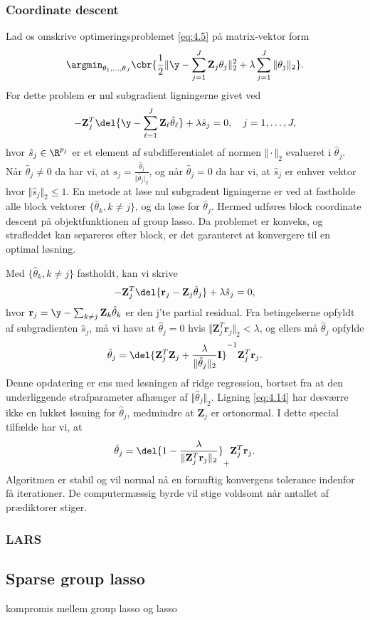 \subsubsection{Coordinate descent}
Lad os omskrive optimeringsproblemet \eqref{eq:4.5} på matrix-vektor form
\begin{align*}
\argmin_{\theta_1, \ldots, \theta_J} \cbr{\frac{1}{2} \Vert \y - \sum_{j=1}^J \mathbf{Z}_{j} \theta_j \Vert_2^2 + \lambda \sum_{j=1}^J \Vert \theta_j \Vert_2}.
\end{align*}
For dette problem er nul subgradient ligningerne givet ved
\begin{align*}
- \mathbf{Z}_{j}^T \del{\y - \sum_{\ell=1}^J \mathbf{Z}_\ell \hat{\theta}_\ell} + \lambda \hat{s}_j = 0, \quad j=1,\ldots, J,
\end{align*} 
hvor $\hat{s}_j \in \R^{p_j}$ er et element af subdifferentialet af normen $\Vert \cdot \Vert_2$ evalueret i $\hat{\theta}_j$.
Når $\hat{\theta}_j \neq 0$ da har vi, at $\hat{s}_j = \frac{\hat{\theta}_j}{\Vert \hat{\theta}_j \vert_2}$, og når $\hat{\theta}_j=0$ da har vi, at $\hat{s}_j$ er enhver vektor hvor $\Vert \hat{s}_j \Vert_2 \leq 1$.
En metode at løse nul subgradent ligningerne er ved at fastholde alle block vektorer $\{\hat{\theta}_k, k \neq j\}$, og da løse for $\hat{\theta}_j$.
Hermed udføres block coordinate descent på objektfunktionen af group lasso.
Da problemet er konveks, og strafleddet kan separeres efter block, er det garanteret at konvergere til en optimal løsning.

Med $\{\hat{\theta}_k, k \neq j\}$ fastholdt, kan vi skrive
\begin{align*}
- \mathbf{Z}_{j}^T \del{\mathbf{r}_j - \mathbf{Z}_j \hat{\theta}_j} + \lambda \hat{s}_j = 0,
\end{align*}
hvor $\mathbf{r}_j = \y - \sum_{k \neq j} \mathbf{Z}_k \hat{\theta}_k $ er den j'te partial residual.
Fra betingelserne opfyldt af subgradienten $\hat{s}_j$, må vi have at $\hat{\theta}_j =0$ hvis $\Vert \mathbf{Z}_j^T \mathbf{r}_j \Vert_2 < \lambda$, og ellers må $\hat{\theta}_j$ opfylde
\begin{align}
\hat{\theta}_j = \del{\mathbf{Z}_j^T \mathbf{Z}_j + \frac{\lambda}{\Vert \hat{\theta}_j \Vert_2} \mathbf{I}}^{-1} \mathbf{Z}_j^T \mathbf{r}_j. \label{eq:4.14}
\end{align}
Denne opdatering er ens med løsningen af ridge regression, bortset fra at den underliggende strafparameter afhænger af $\Vert \hat{\theta}_j \Vert_2$.
Ligning \eqref{eq:4.14} har desværre ikke en lukket løsning for $\hat{\theta}_j$, medmindre at $\mathbf{Z}_j$ er ortonormal. I dette special tilfælde har vi, at
\begin{align*}
\hat{\theta}_j = \del{1 - \frac{\lambda}{\Vert \mathbf{Z}_j^T \mathbf{r}_j \Vert_2}}_+  \mathbf{Z}_j^T \mathbf{r}_j.
\end{align*}
Algoritmen er stabil og vil normal nå en fornuftig konvergens tolerance indenfor få iterationer.
De computermæssig byrde vil stige voldsomt når antallet af prædiktorer stiger.


\subsubsection{LARS}

\subsection{Sparse group lasso}
kompromis mellem group lasso og lasso
\newpage